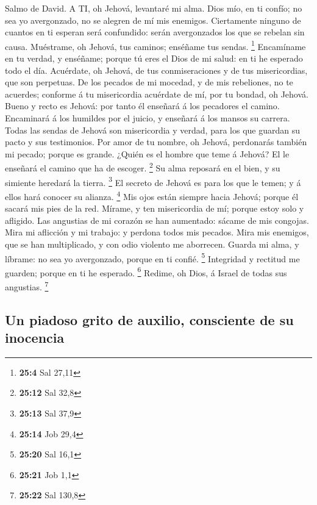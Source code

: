  Salmo de David. A TI, oh Jehová, levantaré mi alma.
 Dios mío, en ti confío; no sea yo avergonzado, no se
alegren de mí mis enemigos.  Ciertamente ninguno de cuantos
en ti esperan será confundido: serán avergonzados los que se rebelan sin
causa.  Muéstrame, oh Jehová, tus caminos; enséñame tus
sendas. \footnote{\textbf{25:4} Sal 27,11}  Encamíname en tu
verdad, y enséñame; porque tú eres el Dios de mi salud: en ti he
esperado todo el día.  Acuérdate, oh Jehová, de tus
conmiseraciones y de tus misericordias, que son perpetuas. 
De los pecados de mi mocedad, y de mis rebeliones, no te acuerdes;
conforme á tu misericordia acuérdate de mí, por tu bondad, oh Jehová.
 Bueno y recto es Jehová: por tanto él enseñará á los
pecadores el camino.  Encaminará á los humildes por el
juicio, y enseñará á los mansos su carrera.  Todas las
sendas de Jehová son misericordia y verdad, para los que guardan su
pacto y sus testimonios.  Por amor de tu nombre, oh Jehová,
perdonarás también mi pecado; porque es grande.  ¿Quién es
el hombre que teme á Jehová? El le enseñará el camino que ha de escoger.
\footnote{\textbf{25:12} Sal 32,8}  Su alma reposará en el
bien, y su simiente heredará la tierra. \footnote{\textbf{25:13} Sal
  37,9}  El secreto de Jehová es para los que le temen; y á
ellos hará conocer su alianza. \footnote{\textbf{25:14} Job 29,4}
 Mis ojos están siempre hacia Jehová; porque él sacará mis
pies de la red.  Mírame, y ten misericordia de mí; porque
estoy solo y afligido.  Las angustias de mi corazón se han
aumentado: sácame de mis congojas.  Mira mi aflicción y mi
trabajo: y perdona todos mis pecados.  Mira mis enemigos,
que se han multiplicado, y con odio violento me aborrecen. 
Guarda mi alma, y líbrame: no sea yo avergonzado, porque en ti confié.
\footnote{\textbf{25:20} Sal 16,1}  Integridad y rectitud
me guarden; porque en ti he esperado. \footnote{\textbf{25:21} Job 1,1}
 Redime, oh Dios, á Israel de todas sus angustias.
\footnote{\textbf{25:22} Sal 130,8}

\hypertarget{un-piadoso-grito-de-auxilio-consciente-de-su-inocencia}{%
\subsection{Un piadoso grito de auxilio, consciente de su
inocencia}\label{un-piadoso-grito-de-auxilio-consciente-de-su-inocencia}}

